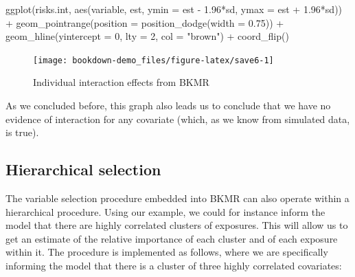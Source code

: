 \documentclass[
]{book}
\newenvironment{Shaded}{\begin{snugshade}}{\end{snugshade}}
\newcommand{\AttributeTok}[1]{\textcolor[rgb]{0.77,0.63,0.00}{#1}}
\newcommand{\DecValTok}[1]{\textcolor[rgb]{0.00,0.00,0.81}{#1}}
\newcommand{\FloatTok}[1]{\textcolor[rgb]{0.00,0.00,0.81}{#1}}
\newcommand{\FunctionTok}[1]{\textcolor[rgb]{0.00,0.00,0.00}{#1}}
\newcommand{\NormalTok}[1]{#1}
\newcommand{\SpecialCharTok}[1]{\textcolor[rgb]{0.00,0.00,0.00}{#1}}
\newcommand{\StringTok}[1]{\textcolor[rgb]{0.31,0.60,0.02}{#1}}
\begin{document}
\begin{Shaded}
\begin{Highlighting}[]
\FunctionTok{ggplot}\NormalTok{(risks.int, }\FunctionTok{aes}\NormalTok{(variable, est, }\AttributeTok{ymin =}\NormalTok{ est }\SpecialCharTok{{-}} \FloatTok{1.96}\SpecialCharTok{*}\NormalTok{sd, }\AttributeTok{ymax =}\NormalTok{ est }\SpecialCharTok{+} \FloatTok{1.96}\SpecialCharTok{*}\NormalTok{sd)) }\SpecialCharTok{+} 
  \FunctionTok{geom\_pointrange}\NormalTok{(}\AttributeTok{position =} \FunctionTok{position\_dodge}\NormalTok{(}\AttributeTok{width =} \FloatTok{0.75}\NormalTok{)) }\SpecialCharTok{+} 
  \FunctionTok{geom\_hline}\NormalTok{(}\AttributeTok{yintercept =} \DecValTok{0}\NormalTok{, }\AttributeTok{lty =} \DecValTok{2}\NormalTok{, }\AttributeTok{col =} \StringTok{"brown"}\NormalTok{) }\SpecialCharTok{+} \FunctionTok{coord\_flip}\NormalTok{()}
\end{Highlighting}
\end{Shaded}

\begin{figure}[H]

{\centering \texttt{[image: bookdown-demo\_files/figure-latex/save6-1]} 

}

\caption{Individual interaction effects from BKMR}\label{fig:save6}
\end{figure}

As we concluded before, this graph also leads us to conclude that we have no evidence of interaction for any covariate (which, as we know from simulated data, is true).

\hypertarget{hierarchical-selection}{%
\subsection{Hierarchical selection}\label{hierarchical-selection}}

The variable selection procedure embedded into BKMR can also operate within a hierarchical procedure. Using our example, we could for instance inform the model that there are highly correlated clusters of exposures. This will allow us to get an estimate of the relative importance of each cluster and of each exposure within it. The procedure is implemented as follows, where we are specifically informing the model that there is a cluster of three highly correlated covariates:
\end{document}
